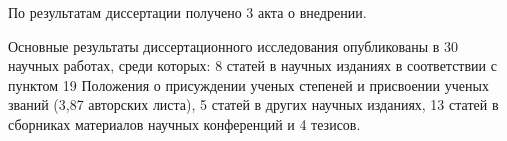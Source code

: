 По результатам диссертации получено 3 акта о внедрении.


\vspace{3mm}
\publications
\vspace{3mm}

Основные результаты диссертационного исследования опубликованы в 30 научных работах, среди которых: 8 статей в научных изданиях в соответствии с пунктом 19 Положения о присуждении ученых степеней и присвоении ученых званий (3,87 авторских листа), 5 статей в других научных изданиях, 13 статей в сборниках материалов научных конференций и 4 тезисов.
